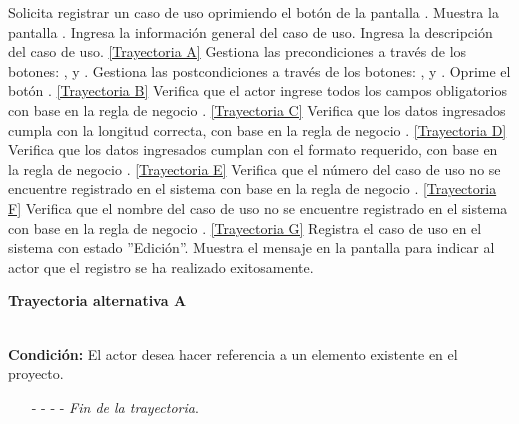 	\begin{UCtrayectoria}
		\UCpaso[\UCactor] Solicita registrar un caso de uso oprimiendo el botón  de la pantalla .
		\UCpaso[\UCsist] Muestra la pantalla .\label{CU12.1-P2}
		\UCpaso[\UCactor] Ingresa la información general del caso de uso. \label{CU12.1-P12}
		\UCpaso[\UCactor] Ingresa la descripción del caso de uso. \hyperlink{CU12-1:TAA}{[Trayectoria A]}
		\UCpaso[\UCactor] Gestiona las precondiciones a través de los botones: , \editar y \eliminar. \label{CU12.1-P17}
		\UCpaso[\UCactor] Gestiona las postcondiciones a través de los botones: , \editar y \eliminar. \label{CU12.1-P18}
		\UCpaso[\UCactor] Oprime el botón . \label{CU10.1-P5} \hyperlink{CU12-1:TAB}{[Trayectoria B]}
		\UCpaso[\UCsist] Verifica que el actor ingrese todos los campos obligatorios con base en la regla de negocio . \hyperlink{CU12-1:TAC}{[Trayectoria C]}
		\UCpaso[\UCsist] Verifica que los datos ingresados cumpla con la longitud correcta, con base en la regla de negocio . \hyperlink{CU12-1:TAD}{[Trayectoria D]}
		\UCpaso[\UCsist] Verifica que los datos ingresados cumplan con el formato requerido, con base en la regla de negocio . \hyperlink{CU12-1:TAE}{[Trayectoria E]}
		\UCpaso[\UCsist] Verifica que el número del caso de uso no se encuentre registrado en el sistema con base en la regla de negocio . \hyperlink{CU12-1:TAF}{[Trayectoria F]}
		\UCpaso[\UCsist] Verifica que el nombre del caso de uso no se encuentre registrado en el sistema con base en la regla de negocio . \hyperlink{CU12-1:TAG}{[Trayectoria G]}
		\UCpaso[\UCsist] Registra el caso de uso en el sistema con estado ''Edición''.
		\UCpaso[\UCsist] Muestra el mensaje  en la pantalla  para indicar al actor que el registro se ha realizado exitosamente.
	\end{UCtrayectoria}		
\hypertarget{CU12-1:TAA}{\textbf{Trayectoria alternativa A}}\\
\noindent \textbf{Condición:} El actor desea hacer referencia a un elemento existente en el proyecto.
\begin{enumerate}
	\UCpaso[\UCactor] Ingresa el token correspondiente al elemento a referenciar.
	\UCpaso[\UCsist] Verifica que los tokens utilizados se encuentren correctamente estructurados, con base en la regla de negocio . 
	\UCpaso[\UCsist] Obtiene los elementos registrados en el proyecto correspondientes al token ingresado. 
	\UCpaso[\UCsist] Muestra una lista con los elementos encontrados.
	\UCpaso[\UCactor] Selecciona un elemento de la lista.
	\UCpaso[\UCsist] Verifica que el nombre del elemento seleccionado no contenga espacios. \hyperlink{CU12-1:TAH}{[Trayectoria H]}
	\UCpaso[\UCsist] Agrega la referencia del elemento al texto. \label{CU12.1-TA1}
	\UCpaso Continúa en el paso \ref{CU12.1-P17} de la trayectoria principal.
	\item[- -] - - {\em {Fin de la trayectoria}}.%
\end{enumerate}
